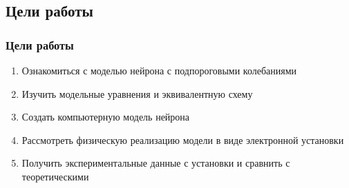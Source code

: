 \subsection{Цели работы}
\begin{frame}[t]
	\frametitle{Цели работы}
	\vfill
	\begin{spacing}{1}
		\begin{enumerate}
			\item Ознакомиться с моделью нейрона с подпороговыми колебаниями
			\item Изучить модельные уравнения и эквивалентную схему
			\item Создать компьютерную модель нейрона
			\item Рассмотреть физическую реализацию модели в виде электронной установки
			\item Получить экспериментальные данные с установки и сравнить с теоретическими
		\end{enumerate}
	\end{spacing}
	\vfill
\end{frame}
